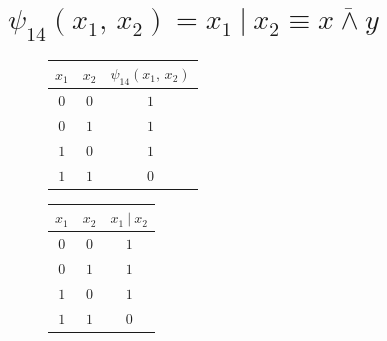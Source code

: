 \documentclass[12pt,a4paper]{article}
\theoremstyle{plain}
\theoremstyle{definition}
\theoremstyle{remark}
\numberwithin{equation}{section}
\begin{document}
\section{$\psi_{14}(x_1,\,x_2) = x_1\ |\ x_2 \equiv \overline{x \land y}$}

\begin{figure}[H]
  \begin{minipage}[t]{0.27\textwidth}
    \vspace{0em}
    \begin{tabularx}{\linewidth}{|C|C|C C|}
      \hline
      $x_1$ & $x_2$ &  \\
      \hline
      $0$ & $0$ &  \\
      $0$ & $1$ &  \\
      $1$ & $0$ &  \\
      $1$ & $1$ &  \\
      \hline
    \end{tabularx}
  \end{minipage} \hfill
  \begin{minipage}[t]{0.05\textwidth}
    \hspace{0em}
    \vspace{3em}

    \resizebox{\textwidth}{\textwidth}{$=$}
  \end{minipage} \hfill
  \begin{minipage}[t]{0.27\textwidth}
    \vspace{0em}
    \begin{tabularx}{\linewidth}{|C|C|C C|}
      \hline
      $x_1$ & $x_2$ &  \\
      \hline
      $0$ & $0$ &  \\
      $0$ & $1$ &  \\
      $1$ & $0$ &  \\
      $1$ & $1$ &  \\
      \hline
    \end{tabularx}
  \end{minipage} \hfill
  \begin{minipage}[t]{0.05\textwidth}
    \hspace{0em}
    \vspace{2.5em}


\end{minipage}
\end{figure}
\end{document}
